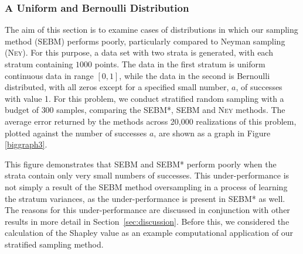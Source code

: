\subsubsection{A Uniform and Bernoulli Distribution}
\label{sec:dataset2}
The aim of this section is to examine cases of distributions in which our sampling method (SEBM) performs poorly, particularly compared to Neyman sampling (\textsc{Ney}).
For this purpose, a data set with two strata is generated, with each stratum containing $1000$ points. 
The data in the first stratum is uniform continuous data in range $[0,1]$, while the data in the second is Bernoulli distributed, with all zeros except for a specified small number, $a$, of successes with value 1.
For this problem, we conduct stratified random sampling with a budget of $300$ samples, comparing the SEBM*, SEBM and \textsc{Ney} methods.
The average error returned by the methods across 20,000 realizations of this problem, plotted against the number of successes $a$, are shown as a graph in Figure \ref{biggraph3}.

This figure demonstrates that SEBM and SEBM* perform poorly when the strata contain only very small numbers of successes.
This under-performance is not simply a result of the SEBM method oversampling in a process of learning the stratum variances, as the under-performance is present in SEBM* as well.
The reasons for this under-performance are discussed in conjunction with other results in more detail in Section~\ref{sec:discussion}.
Before this, we considered the calculation of the Shapley value as an example computational application of our stratified sampling method.











